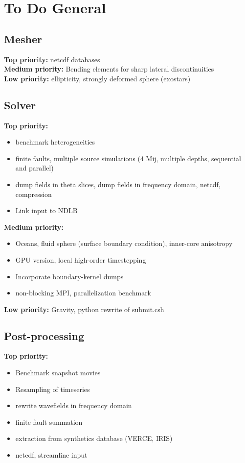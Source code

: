 \documentclass[11pt,letter,fleqn,english,notitlepage]{article}
\begin{document}


\section{To Do General}
\subsection{Mesher}

\textbf{Top priority:} netcdf databases\\

\noindent\textbf{Medium priority:} Bending elements for sharp lateral discontinuities\\

\noindent\textbf{Low priority:} ellipticity, strongly deformed sphere
(exostars)

\subsection{Solver}
\noindent\textbf{Top priority:} 
\begin{itemize}
    \item benchmark heterogeneities
    \item finite faults, multiple source simulations (4 Mij,
    multiple depths, sequential and parallel)
    \item dump fields in theta slices, dump fields in frequency domain,
      netcdf, compression
    \item Link input to NDLB
\end{itemize}

\noindent\textbf{Medium priority:}
\begin{itemize}
    \item Oceans, fluid sphere (surface boundary condition),
      inner-core anisotropy
    \item GPU version, local high-order timestepping
    \item Incorporate boundary-kernel dumps
    \item non-blocking MPI, parallelization benchmark

\end{itemize}

\noindent\textbf{Low priority:}
Gravity, python rewrite of submit.csh

\subsection{Post-processing}
\noindent\textbf{Top priority:} 
\begin{itemize}
    \item Benchmark snapshot movies
    \item Resampling of timeseries
    \item rewrite wavefields in frequency domain
    \item finite fault summation
    \item extraction from synthetics database (VERCE, IRIS)
    \item netcdf, streamline input
\end{itemize}
\end{document}
